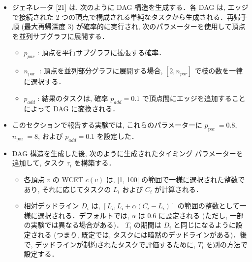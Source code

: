 \begin{frame}{}
    \begin{itemize}
        \item ジェネレータ [21] は, 次のように DAG 構造を生成する．各 DAG は, エッジで接続された 2 つの頂点で構成される単純なタスクから生成される．再帰手順 (最大再帰深度 3) が確率的に実行され, 次のパラメーターを使用して頂点を並列サブグラフに展開する．
              \begin{itemize}
                  \item  $p_{p a r}$ : 頂点を平行サブグラフに拡張する確率．

                  \item  $n_{\text {par }}$ : 頂点を並列部分グラフに展開する場合, $\left[2, n_{p a r}\right]$ で枝の数を一律に選択する．

                  \item  $p_{a d d}$ : 結果のタスクは, 確率 $p_{a d d}=0.1$ で頂点間にエッジを追加することによって DAG に変換される．

              \end{itemize}
    \end{itemize}
\end{frame}

\begin{frame}{}
    \begin{itemize}
        \item このセクションで報告する実験では, これらのパラメーターに $p_{\text {par }}=0.8$, $n_{\text {par }}=8$, および $p_{a d d}=0.1$ を設定した．
    \end{itemize}
\end{frame}

\begin{frame}{}
    \begin{itemize}
        \item DAG 構造を生成した後, 次のように生成されたタイミング パラメーターを追加して, タスク $\tau_{i}$ を構築する．

              \begin{itemize}
                  \item  各頂点 $v$ の WCET $c(v)$ は, [1, 100] の範囲で一様に選択された整数であり, それに応じてタスクの $L_{i}$ および $C_{i}$ が計算される．

                  \item  相対デッドライン $D_{i}$ は, $\left[L_{i}, L_{i}+\alpha\left(C_{i}-L_{i}\right)\right]$ の範囲の整数として一様に選択される．デフォルトでは, $\alpha$ は $0.6$ に設定される (ただし, 一部の実験では異なる場合がある)． $T_{i}$ の期間は $D_{i}$ と同じになるように設定される (つまり, 既定では, タスクには暗黙のデッドラインがある)．後で, デッドラインが制約されたタスクで評価するために, $T_{i}$ を別の方法で設定する．

              \end{itemize}
    \end{itemize}
\end{frame}

